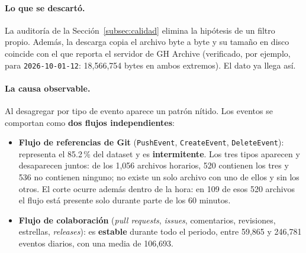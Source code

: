 \paragraph{Lo que se descartó.} La auditoría de la Sección~\ref{subsec:calidad} elimina la hipótesis de un filtro propio. Además, la descarga copia el archivo byte a byte y su tamaño en disco coincide con el que reporta el servidor de GH Archive (verificado, por ejemplo, para \texttt{2026-10-01-12}: 18,566,754 bytes en ambos extremos). El dato ya llega así.

\paragraph{La causa observable.} Al desagregar por tipo de evento aparece un patrón nítido. Los eventos se comportan como \textbf{dos flujos independientes}:

\begin{itemize}[leftmargin=*]
    \item \textbf{Flujo de referencias de Git} (\texttt{PushEvent}, \texttt{CreateEvent}, \texttt{DeleteEvent}): representa el 85.2\,\% del dataset y es \textbf{intermitente}. Los tres tipos aparecen y desaparecen juntos: de los 1,056 archivos horarios, 520 contienen los tres y 536 no contienen ninguno; no existe un solo archivo con uno de ellos y sin los otros. El corte ocurre además dentro de la hora: en 109 de esos 520 archivos el flujo está presente solo durante parte de los 60 minutos.
    \item \textbf{Flujo de colaboración} (\textit{pull requests}, \textit{issues}, comentarios, revisiones, estrellas, \textit{releases}): es \textbf{estable} durante todo el periodo, entre 59,865 y 246,781 eventos diarios, con una media de 106,693.
\end{itemize}

